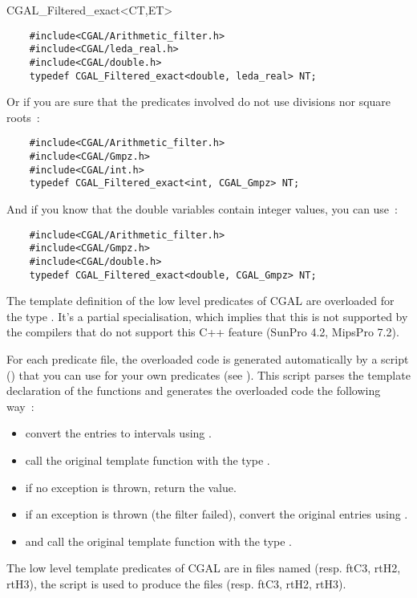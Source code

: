 \begin{ccClass} {CGAL_Filtered_exact<CT,ET>}
\begin{verbatim}
    #include<CGAL/Arithmetic_filter.h>
    #include<CGAL/leda_real.h>
    #include<CGAL/double.h>
    typedef CGAL_Filtered_exact<double, leda_real> NT;
\end{verbatim}

Or if you are sure that the predicates involved do not use divisions nor
square roots~:

\begin{verbatim}
    #include<CGAL/Arithmetic_filter.h>
    #include<CGAL/Gmpz.h>
    #include<CGAL/int.h>
    typedef CGAL_Filtered_exact<int, CGAL_Gmpz> NT;
\end{verbatim}

And if you know that the double variables contain integer values, you can
use~:

\begin{verbatim}
    #include<CGAL/Arithmetic_filter.h>
    #include<CGAL/Gmpz.h>
    #include<CGAL/double.h>
    typedef CGAL_Filtered_exact<double, CGAL_Gmpz> NT;
\end{verbatim}

\ccImplementation

The template definition of the low level predicates of CGAL are overloaded for
the type .  It's a partial specialisation,
which implies that this is not supported by the compilers that do not support
this C++ feature (SunPro 4.2, MipsPro 7.2).

For each predicate file, the overloaded code is generated automatically by a
 script
() that you can
use for your own predicates (see ).
This script parses the template declaration of the functions and generates the
overloaded code the following way~:
\begin{itemize}
\item convert the entries to intervals using
    .
\item call the original template function with the type
    .
\item if no exception is thrown, return the value.
\item if an exception is thrown (the filter failed), convert the original
    entries using .
\item and call the original template function with the type .
\end{itemize}

\ccExample

The low level template predicates of CGAL are in files named
 (resp. ftC3, rtH2, rtH3), the script is used
to produce the files  (resp.
ftC3, rtH2, rtH3).

\end{ccClass}
